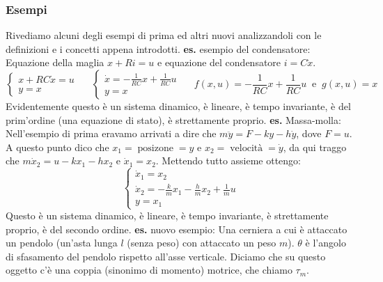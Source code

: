 \subsubsection{Esempi}
Rivediamo alcuni degli esempi di prima ed altri nuovi analizzandoli con le definizioni e i concetti appena introdotti.\newline
\newline
\textbf{es.} esempio del condensatore:\newline
Equazione della maglia $x + Ri = u$ e equazione del condensatore $i = C \dot{x}$.\newline
$$
\begin{cases}
    x + RC \dot{x} = u\\
    y=x
\end{cases} \;\;\;\;\;\begin{cases}
    \dot{x} = -\frac{1}{RC}x + \frac{1}{RC} u\\
    y = x
\end{cases} \;\;\;\;\; f(x,u) = -\frac{1}{RC}x + \frac{1}{RC} u \;\;\text{e}\;\; g(x,u) = x
$$
Evidentemente questo è un sistema dinamico, è lineare, è tempo invariante, è del prim'ordine (una equazione di stato), è strettamente proprio.\newline
\newline
\textbf{es.} Massa-molla:\newline
Nell'esempio di prima eravamo arrivati a dire che $m \ddot{y} = F - ky - h \dot{y}$, dove $F = u$.\newline
A questo punto dico che $x_1 = \; \text{posizone}\; = y$ e $x_2 = \; \text{velocità}\; = \dot{y}$, da qui traggo che $m \dot{x}_2 = u - k x_1 - h x_2$ e $\dot{x}_1 = x_2$. \newline
Mettendo tutto assieme ottengo:
\[
    \begin{cases}
        \dot{x}_1 = x_2\\
        \dot{x}_2 = -\frac{k}{m} x_1 - \frac{h}{m}x_2 + \frac{1}{m} u\\
        y = x_1
    \end{cases}
\]
Questo è un sistema dinamico, è lineare, è tempo invariante, è strettamente proprio, è del secondo ordine.\newline
\newline
\textbf{es.} nuovo esempio:\newline
Una cerniera a cui è attaccato un pendolo (un'asta lunga $l$ (senza peso) con attaccato un peso $m$). $\theta$ è l'angolo di sfasamento del pendolo rispetto all'asse verticale. Diciamo che su questo oggetto c'è una coppia (sinonimo di momento) motrice, che chiamo $\tau_m$.\newline
